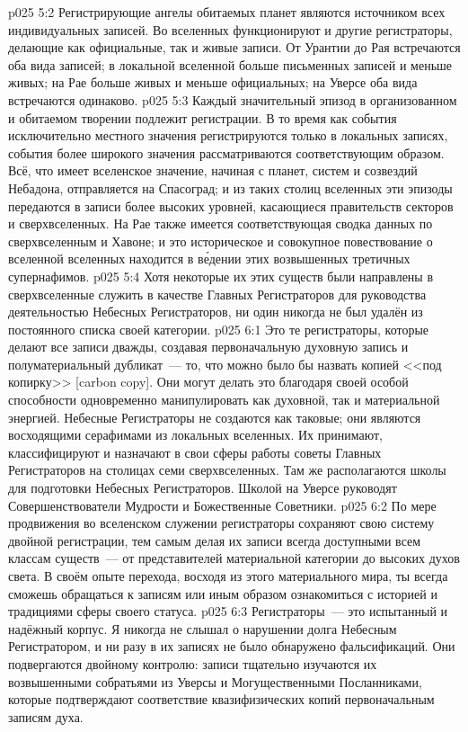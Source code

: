 \vs p025 5:2 Регистрирующие ангелы обитаемых планет являются источником всех индивидуальных записей. Во вселенных функционируют и другие регистраторы, делающие как официальные, так и живые записи. От Урантии до Рая встречаются оба вида записей; в локальной вселенной больше письменных записей и меньше живых; на Рае больше живых и меньше официальных; на Уверсе оба вида встречаются одинаково.
\vs p025 5:3 Каждый значительный эпизод в организованном и обитаемом творении подлежит регистрации. В то время как события исключительно местного значения регистрируются только в локальных записях, события более широкого значения рассматриваются соответствующим образом. Всё, что имеет вселенское значение, начиная с планет, систем и созвездий Небадона, отправляется на Спасоград; и из таких столиц вселенных эти эпизоды передаются в записи более высоких уровней, касающиеся правительств секторов и сверхвселенных. На Рае также имеется соответствующая сводка данных по сверхвселенным и Хавоне; и это историческое и совокупное повествование о вселенной вселенных находится в в\'едении этих возвышенных третичных супернафимов.
\vs p025 5:4 Хотя некоторые их этих существ были направлены в сверхвселенные служить в качестве Главных Регистраторов для руководства деятельностью Небесных Регистраторов, ни один никогда не был удалён из постоянного списка своей категории.
\vs p025 6:1 Это те регистраторы, которые делают все записи дважды, создавая первоначальную духовную запись и полуматериальный дубликат~--- то, что можно было бы назвать копией <<под копирку>> [carbon copy]. Они могут делать это благодаря своей особой способности одновременно манипулировать как духовной, так и материальной энергией. Небесные Регистраторы не создаются как таковые; они являются восходящими серафимами из локальных вселенных. Их принимают, классифицируют и назначают в свои сферы работы советы Главных Регистраторов на столицах семи сверхвселенных. Там же располагаются школы для подготовки Небесных Регистраторов. Школой на Уверсе руководят Совершенствователи Мудрости и Божественные Советники.
\vs p025 6:2 По мере продвижения во вселенском служении регистраторы сохраняют свою систему двойной регистрации, тем самым делая их записи всегда доступными всем классам существ~--- от представителей материальной категории до высоких духов света. В своём опыте перехода, восходя из этого материального мира, ты всегда сможешь обращаться к записям или иным образом ознакомиться с историей и традициями сферы своего статуса.
\vs p025 6:3 Регистраторы~--- это испытанный и надёжный корпус. Я никогда не слышал о нарушении долга Небесным Регистратором, и ни разу в их записях не было обнаружено фальсификаций. Они подвергаются двойному контролю: записи тщательно изучаются их возвышенными собратьями из Уверсы и Могущественными Посланниками, которые подтверждают соответствие квазифизических копий первоначальным записям духа.
